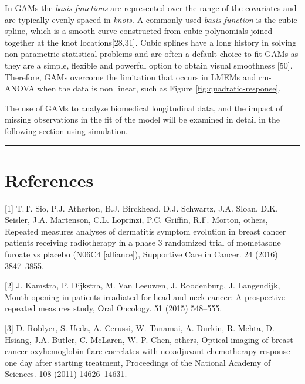 \documentclass[
]{article}
\begin{document}
In GAMs the \emph{basis functions} are represented over the range of the covariates and are typically evenly spaced in \emph{knots}. A commonly used \emph{basis function} is the cubic spline, which is a smooth curve constructed from cubic polynomials joined together at the knot locations{[}28,31{]}. Cubic splines have a long history in solving non-parametric statistical problems and are often a default choice to fit GAMs as they are a simple, flexible and powerful option to obtain visual smoothness {[}50{]}. Therefore, GAMs overcome the limitation that occurs in LMEMs and rm-ANOVA when the data is non linear, such as Figure \ref{fig:quadratic-response}.

The use of GAMs to analyze biomedical longitudinal data, and the impact of missing observations in the fit of the model will be examined in detail in the following section using simulation.

\begin{center}\rule{0.5\linewidth}{0.5pt}\end{center}

\hypertarget{references}{%
\section*{References}\label{references}}

\hypertarget{refs}{}
\leavevmode\hypertarget{ref-sio2016}{}%
{[}1{]} T.T. Sio, P.J. Atherton, B.J. Birckhead, D.J. Schwartz, J.A. Sloan, D.K. Seisler, J.A. Martenson, C.L. Loprinzi, P.C. Griffin, R.F. Morton, others, Repeated measures analyses of dermatitis symptom evolution in breast cancer patients receiving radiotherapy in a phase 3 randomized trial of mometasone furoate vs placebo (N06C4 {[}alliance{]}), Supportive Care in Cancer. 24 (2016) 3847--3855.

\leavevmode\hypertarget{ref-kamstra2015}{}%
{[}2{]} J. Kamstra, P. Dijkstra, M. Van Leeuwen, J. Roodenburg, J. Langendijk, Mouth opening in patients irradiated for head and neck cancer: A prospective repeated measures study, Oral Oncology. 51 (2015) 548--555.

\leavevmode\hypertarget{ref-roblyer2011}{}%
{[}3{]} D. Roblyer, S. Ueda, A. Cerussi, W. Tanamai, A. Durkin, R. Mehta, D. Hsiang, J.A. Butler, C. McLaren, W.-P. Chen, others, Optical imaging of breast cancer oxyhemoglobin flare correlates with neoadjuvant chemotherapy response one day after starting treatment, Proceedings of the National Academy of Sciences. 108 (2011) 14626--14631.
\end{document}
